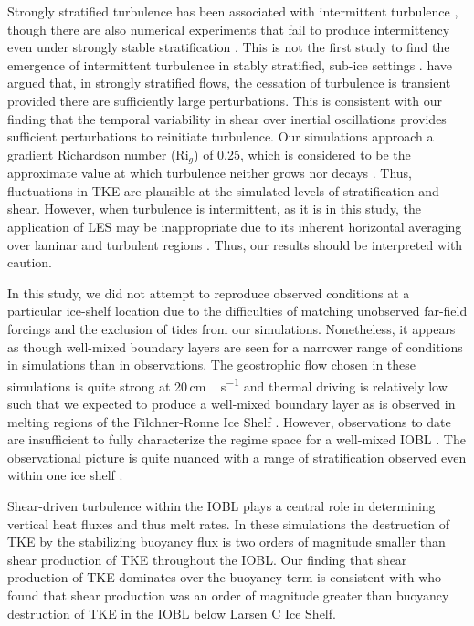 \documentclass[tc, manuscript]{copernicus}
\begin{document}
Strongly stratified turbulence has been associated with intermittent turbulence \citep{nieuwstadt_direct_2005, wiel_cessation_2012}, though there are also numerical experiments that fail to produce intermittency even under strongly stable stratification \citep{arya_buoyancy_1975, komori_turbulence_1983}. This is not the first study to find the emergence of intermittent turbulence in stably stratified, sub-ice settings \citep{vreugdenhil_stratification_2019}. \citet{donda_collapse_2015} have argued that, in strongly stratified flows, the cessation of turbulence is transient provided there are sufficiently large perturbations. This is consistent with our finding that the temporal variability in shear over inertial oscillations provides sufficient perturbations to reinitiate turbulence. Our simulations approach a gradient Richardson number ($\text{Ri}_g$) of 0.25, which is considered to be the approximate value at which turbulence neither grows nor decays \citep{holt_numerical_1992, rohr_growth_1988}. Thus, fluctuations in TKE are plausible at the simulated levels of stratification and shear. However, when turbulence is intermittent, as it is in this study, the application of LES may be inappropriate due to its inherent horizontal averaging over laminar and turbulent regions \citep{stoll_large-eddy_2008}. Thus, our results should be interpreted with caution. 

In this study, we did not attempt to reproduce observed conditions at a particular ice-shelf location due to the difficulties of matching unobserved far-field forcings and the exclusion of tides from our simulations. Nonetheless, it appears as though well-mixed boundary layers are seen for a narrower range of conditions in simulations than in observations. The geostrophic flow chosen in these simulations is quite strong at 20\,\unit{cm\,s^{-1}} and thermal driving is relatively low such that we expected to produce a well-mixed boundary layer as is observed in melting regions of the Filchner-Ronne Ice Shelf \citep{nicholls_oceanographic_2001}. However, observations to date are insufficient to fully characterize the regime space for a well-mixed IOBL \citep{malyarenko_synthesis_2020}. The observational picture is quite nuanced with a range of stratification observed even within one ice shelf \citep{hattermann_two_2012}. 

Shear-driven turbulence within the IOBL plays a central role in determining vertical heat fluxes and thus melt rates. In these simulations the destruction of TKE by the stabilizing buoyancy flux is two orders of magnitude smaller than shear production of TKE throughout the IOBL. Our finding that shear production of TKE dominates over the buoyancy term is consistent with \citet{davis_turbulence_2019} who found that shear production was an order of magnitude greater than buoyancy destruction of TKE in the IOBL below Larsen C Ice Shelf. 
\end{document}

